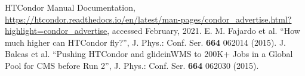 \documentclass{webofc}
\begin{document}
\begin{thebibliography}{}
 HTCondor Manual Documentation, \url{https://htcondor.readthedocs.io/en/latest/man-pages/condor_advertise.html?highlight=condor_advertise}, accessed February, 2021.
 E. M. Fajardo et al. ``How much higher can HTCondor fly?'', J. Phys.: Conf. Ser. \textbf{664} 062014 (2015).
 J. Balcas et al. ``Pushing HTCondor and glideinWMS to 200K+ Jobs in a Global Pool for CMS before Run 2'', J. Phys.: Conf. Ser. \textbf{664} 062030 (2015).
%
\end{thebibliography}
\end{document}
